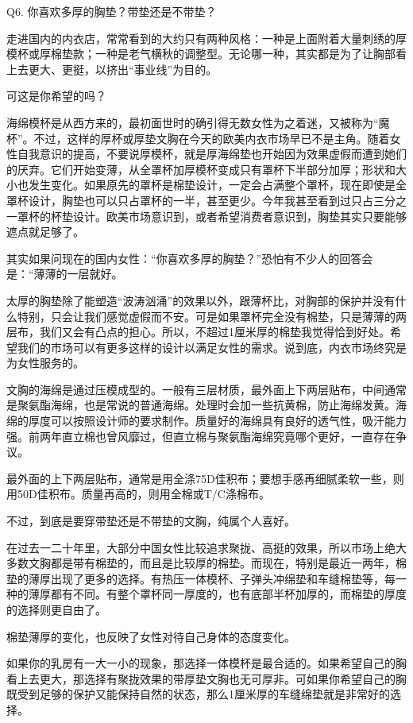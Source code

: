 \documentclass[12pt,UTF8]{ctexbook}
\begin{document}
Q6. 你喜欢多厚的胸垫？带垫还是不带垫？


走进国内的内衣店，常常看到的大约只有两种风格：一种是上面附着大量刺绣的厚模杯或厚棉垫款；一种是老气横秋的调整型。无论哪一种，其实都是为了让胸部看上去更大、更挺，以挤出“事业线”为目的。

可这是你希望的吗？

海绵模杯是从西方来的，最初面世时的确引得无数女性为之着迷，又被称为“魔杯”。不过，这样的厚杯或厚垫文胸在今天的欧美内衣市场早已不是主角。随着女性自我意识的提高，不要说厚模杯，就是厚海绵垫也开始因为效果虚假而遭到她们的厌弃。它们开始变薄，从全罩杯加厚模杯变成只有罩杯下半部分加厚；形状和大小也发生变化。如果原先的罩杯是棉垫设计，一定会占满整个罩杯，现在即使是全罩杯设计，胸垫也可以只占罩杯的一半，甚至更少。今年我甚至看到过只占三分之一罩杯的杯垫设计。欧美市场意识到，或者希望消费者意识到，胸垫其实只要能够遮点就足够了。

其实如果问现在的国内女性：“你喜欢多厚的胸垫？”恐怕有不少人的回答会是：“薄薄的一层就好。



太厚的胸垫除了能塑造“波涛汹涌”的效果以外，跟薄杯比，对胸部的保护并没有什么特别，只会让我们感觉虚假而不安。可是如果罩杯完全没有棉垫，只是薄薄的两层布，我们又会有凸点的担心。所以，不超过1厘米厚的棉垫我觉得恰到好处。希望我们的市场可以有更多这样的设计以满足女性的需求。说到底，内衣市场终究是为女性服务的。

文胸的海绵是通过压模成型的。一般有三层材质，最外面上下两层贴布，中间通常是聚氨酯海绵，也是常说的普通海绵。处理时会加一些抗黄棉，防止海绵发黄。海绵的厚度可以按照设计师的要求制作。质量好的海绵具有良好的透气性，吸汗能力强。前两年直立棉也曾风靡过，但直立棉与聚氨酯海绵究竟哪个更好，一直存在争议。

最外面的上下两层贴布，通常是用全涤75D佳积布；要想手感再细腻柔软一些，则用50D佳积布。质量再高的，则用全棉或T/C涤棉布。

不过，到底是要穿带垫还是不带垫的文胸，纯属个人喜好。

在过去一二十年里，大部分中国女性比较追求聚拢、高挺的效果，所以市场上绝大多数文胸都是带有棉垫的，而且是比较厚的棉垫。而现在，特别是最近一两年，棉垫的薄厚出现了更多的选择。有热压一体模杯、子弹头冲绵垫和车缝棉垫等，每一种的薄厚都有不同。有整个罩杯同一厚度的，也有底部半杯加厚的，而棉垫的厚度的选择则更自由了。

棉垫薄厚的变化，也反映了女性对待自己身体的态度变化。

如果你的乳房有一大一小的现象，那选择一体模杯是最合适的。如果希望自己的胸看上去更大，那选择有聚拢效果的带厚垫文胸也无可厚非。可如果你希望自己的胸既受到足够的保护又能保持自然的状态，那么1厘米厚的车缝绵垫就是非常好的选择。
\end{document}
